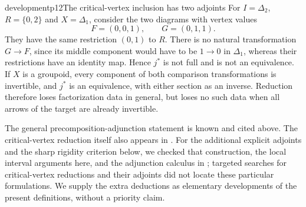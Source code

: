 \begin{dcomment}{development}{p12}{The critical-vertex inclusion has two adjoints}
For $I=\Delta_2$, $R=\{0,2\}$ and $X=\Delta_1$, consider the two diagrams with vertex values
\[
 F=(0,0,1),\qquad G=(0,1,1).
\]
They have the same restriction $(0,1)$ to $R$. There is no natural transformation $G\to F$, since its middle component would have to be $1\to0$ in $\Delta_1$, whereas their restrictions have an identity map. Hence $j^*$ is not full and is not an equivalence. If $X$ is a groupoid, every component of both comparison transformations is invertible, and $j^*$ is an equivalence, with either section as an inverse. Reduction therefore loses factorization data in general, but loses no such data when all arrows of the target are already invertible.

The general precomposition-adjunction statement is known and cited above. The critical-vertex reduction itself also appears in \citet[Lemma~4.16]{ArakawaCnossen2026}. For the additional explicit adjoints and the sharp rigidity criterion below, we checked that construction, the local interval arguments here, and the adjunction calculus in \citet[\S4.3]{Riehl2016}; targeted searches for critical-vertex reductions and their adjoints did not locate these particular formulations. We supply the extra deductions as elementary developments of the present definitions, without a priority claim.
\end{dcomment}


